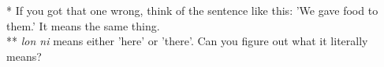 * If you got that one wrong, think of the sentence like this: 
'We gave food to them.' It means the same thing. \\
** \textit{lon ni} means either 'here' or 'there'. 
Can you figure out what it literally means? 
%
